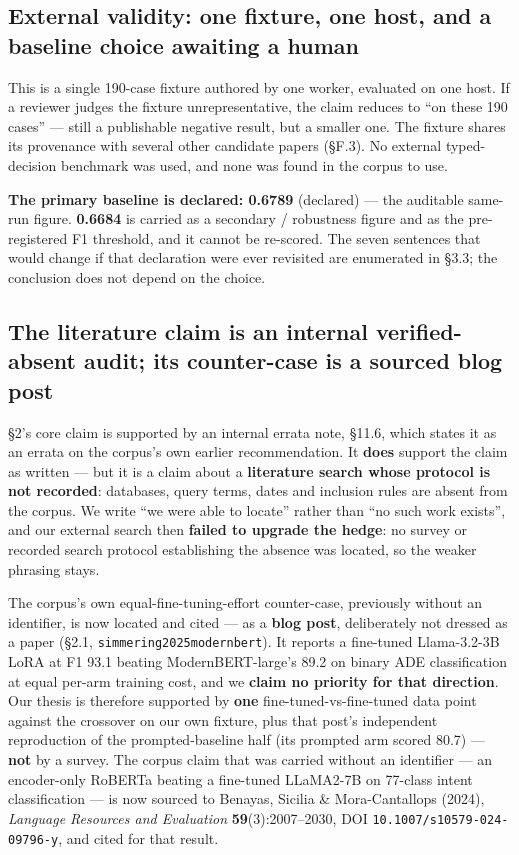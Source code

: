 \documentclass[10pt]{article}
\begin{document}
\subsection{External validity: one fixture, one host, and a baseline choice awaiting a human}

This is a single 190-case fixture authored by one worker, evaluated on one host. If a reviewer judges the fixture unrepresentative, the claim reduces to ``on these 190 cases'' --- still a publishable negative result, but a smaller one. The fixture shares its provenance with several other candidate papers (\S{}F.3). No external typed-decision benchmark was used, and none was found in the corpus to use.

\textbf{The primary baseline is declared: 0.6789} (declared) --- the auditable same-run figure. \textbf{0.6684} is carried as a secondary / robustness figure and as the pre-registered F1 threshold, and it cannot be re-scored. The seven sentences that would change if that declaration were ever revisited are enumerated in \S3.3; the conclusion does not depend on the choice.

\subsection{The literature claim is an internal verified-absent audit; its counter-case is a sourced blog post}

\S2's core claim is supported by an internal errata note, \S11.6\cite{source_corpus_errata_2026}, which states it as an errata on the corpus's own earlier recommendation. It \textbf{does} support the claim as written --- but it is a claim about a \textbf{literature search whose protocol is not recorded}: databases, query terms, dates and inclusion rules are absent from the corpus. We write ``we were able to locate'' rather than ``no such work exists'', and our external search then \textbf{failed to upgrade the hedge}: no survey or recorded search protocol establishing the absence was located, so the weaker phrasing stays.

The corpus's own equal-fine-tuning-effort counter-case, previously without an identifier, is now located and cited --- as a \textbf{blog post}, deliberately not dressed as a paper (\S2.1, \texttt{simmering2025modernbert}\cite{simmering2025modernbert}). It reports a fine-tuned Llama-3.2-3B LoRA at F1 93.1 beating ModernBERT-large's 89.2 on binary ADE classification at equal per-arm training cost, and we \textbf{claim no priority for that direction}. Our thesis is therefore supported by \textbf{one} fine-tuned-vs-fine-tuned data point against the crossover on our own fixture, plus that post's independent reproduction of the prompted-baseline half (its prompted arm scored 80.7) --- \textbf{not} by a survey. The corpus claim that was carried without an identifier --- an encoder-only RoBERTa beating a fine-tuned LLaMA2-7B on 77-class intent classification --- is now sourced to Benayas, Sicilia \& Mora-Cantallops (2024), \emph{Language Resources and Evaluation} \textbf{59}(3):2007--2030, DOI \texttt{10.1007/s10579-024-09796-y}, and cited for that result.
\end{document}
